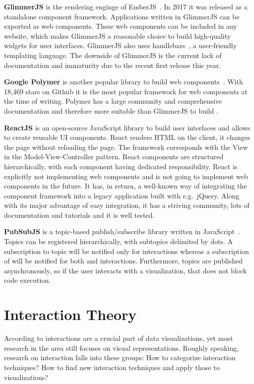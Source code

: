 \textbf{GlimmerJS} is the rendering enginge of EmberJS~\parencite{Ember2017}.
In 2017 it was released as a standalone component framework.
Applications written in GlimmerJS can be exported as web components.
These web components can be included in any website, which makes GlimmerJS a reasonable choice to build high-quality widgets for user interfaces.
GlimmerJS also uses handlebars~\parencite{Handlebars2017}, a user-friendly templating language.
The downside of GlimmerJS is the current lack of documentation and immaturity due to the recent first release this year.

\textbf{Google Polymer} is another popular library to build web components~\parencite{Polymer2017}.
With 18,469 stars on Github it is the most popular framework for web components at the time of writing.
Polymer has a large community and comprehensive documentation and therefore more suitable than GlimmerJS to build \cmvs{}.

\textbf{ReactJS} is an open-source JavaScript library to build user interfaces and allows to create reusable UI components.
React renders HTML on the client, it changes the page without reloading the page.
The framework corresponds with the View in the Model-View-Controller pattern.
React components are structured hierarchically, with each component having dedicated responsibility.
React is explicitly not implementing web components and is not going to implement web components in the future.
It has, in return, a well-known way of integrating the component framework into a legacy application built with e.g.\ jQuery.
Along with its major advantage of easy integration, it has a striving community, lots of documentation and tutorials and it is well tested.

\textbf{PubSubJS} is a topic-based publish/subscribe library written in JavaScript~\parencite{PubSubJS2017}.
Topics can be registered hierarchically, with subtopics delimited by dots.
A subscription to topic  will be notified only for  interactions whereas a subscription of  will be notified for both  and  interactions.
Furthermore, topics are published asynchronously, so if the user interacts with a visualization, that does not block code execution.




\section{Interaction Theory}\label{sec:related-work:interaction-theory}
According to \textcite{Ho2013} interactions are a crucial part of data visualizations, yet most research in the area still focuses on visual representations.
Roughly speaking, research on interaction falls into these groups:
How to categorize interaction techniques?
How to find new interaction techniques and apply those to visualizations?

